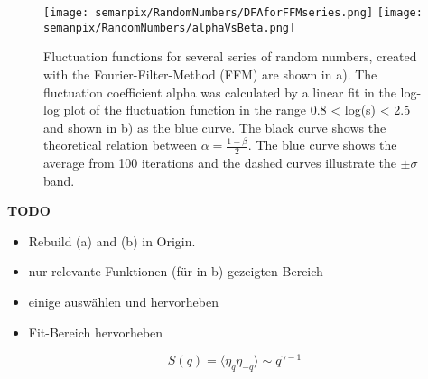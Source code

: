 \documentclass[a4paper,10pt]{scrbook}
\begin{document}
\begin{figure}[htp]
 \centering
 \texttt{[image: semanpix/RandomNumbers/DFAforFFMseries.png]}
 \texttt{[image: semanpix/RandomNumbers/alphaVsBeta.png]}
 \caption[Fluctuation functions $F(s)$ for surrogate data generated by phase randomization (FFM) and relation between fluctuation coefficient $\alpha$ and control parameter $\beta$]{Fluctuation functions for several series of random numbers, created with the Fourier-Filter-Method (FFM) are shown in a). The fluctuation coefficient alpha was calculated by a linear fit in the log-log plot of the fluctuation function in the range 0.8 < log(s) < 2.5 and shown in b) as the blue curve. The black curve shows the theoretical relation between $\alpha=\frac{1+\beta}{2}$. The blue curve shows the average from 100 iterations and the dashed curves illustrate the $\pm \sigma$ band.}
 \label{fig:beta_alpha_random_gen}
\end{figure}









\textbf{TODO }
\begin{itemize}
\item Rebuild (a) and (b) in Origin.
\item nur relevante Funktionen (für in b) gezeigten Bereich
\item einige auswählen und hervorheben
\item Fit-Bereich hervorheben
\end{itemize}


\begin{equation}
 S(q) = \langle \eta_q \eta_{-q} \rangle \sim q^{\gamma-1} 
\end{equation}  



%
%
%

\end{document}
